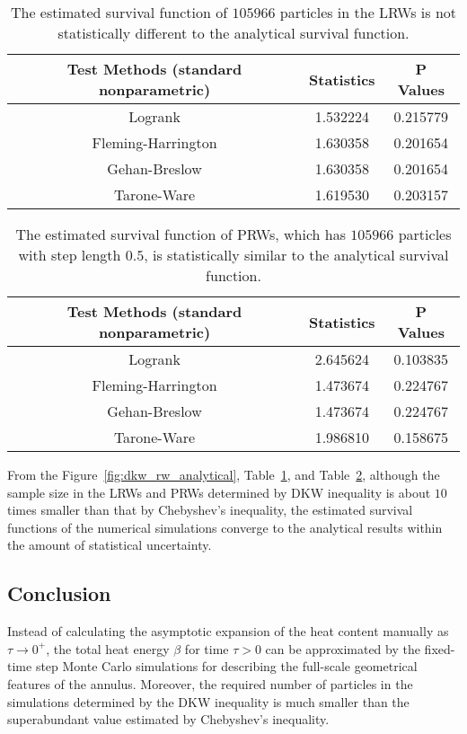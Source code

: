 \begin{table}
  \centering
  \begin{tabular}{|c|c|c|}\hline
    Test Methods (standard nonparametric) & Statistics & P Values \\
    \hline
    Logrank & 1.532224 & 0.215779 \\
    \hline
    Fleming-Harrington & 1.630358 & 0.201654 \\
    \hline
    Gehan-Breslow & 1.630358 & 0.201654 \\
    \hline
    Tarone-Ware & 1.619530 & 0.203157 \\
    \hline
  \end{tabular}
  \caption{The estimated survival function of $105966$ particles in
    the LRWs is not statistically different to the analytical survival
    function.}
  \label{tab:two_sample_test_dkw_lrws_analytical}
\end{table}


\begin{table}
  \centering
  \begin{tabular}{|c|c|c|}\hline
    Test Methods (standard nonparametric) & Statistics & P Values \\
    \hline
    Logrank & 2.645624 & 0.103835 \\
    \hline
    Fleming-Harrington & 1.473674 & 0.224767 \\
    \hline
    Gehan-Breslow & 1.473674 & 0.224767 \\
    \hline
    Tarone-Ware & 1.986810 & 0.158675 \\
    \hline
  \end{tabular}
  \caption{The estimated survival function of PRWs, which has
    $105966$ particles with step length $0.5$, is statistically
    similar to the analytical survival function.}
  \label{tab:two_sample_test_dkw_prws_analytical}
\end{table}

From the Figure~\ref{fig:dkw_rw_analytical},
Table~\ref{tab:two_sample_test_dkw_lrws_analytical}, and
Table~\ref{tab:two_sample_test_dkw_prws_analytical}, although the sample
size in the LRWs and PRWs determined by DKW inequality is about $10$
times smaller than that by Chebyshev’s inequality, the estimated
survival functions of the numerical simulations converge to the
analytical results within the amount of statistical uncertainty.

\subsection{Conclusion}


Instead of calculating the asymptotic expansion of the heat content
manually as $\tau \rightarrow 0^+$, the total heat energy $\beta$
\cite{gilkey1994heat} for time $\tau > 0$ can be approximated by the
fixed-time step Monte Carlo simulations for describing the full-scale
geometrical features of the annulus. Moreover, the required
number of particles in the simulations determined by the DKW
inequality is much smaller than the superabundant value estimated by
Chebyshev’s inequality.
